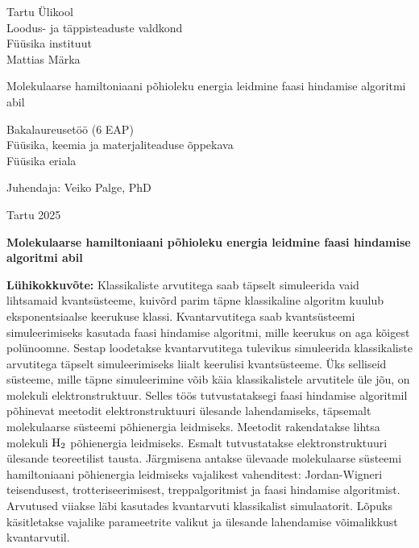 \documentclass[12pt]{report}
\begin{document}
\begin{titlepage}
    \begin{center}
        \large
        {\sc Tartu Ülikool} \\
        Loodus- ja täppisteaduste valdkond \\
        Füüsika instituut \\


        \vspace{25mm}
        \Large Mattias Märka

        \vspace{4mm}
        \Huge Molekulaarse hamiltoniaani põhioleku energia leidmine faasi hindamise algoritmi abil

        \vspace{20mm}
        \Large Bakalaureusetöö (6 EAP) \\
        Füüsika, keemia ja materjaliteaduse õppekava \\
	Füüsika eriala \\

        \vspace{20mm}
        \begin{flushright}
            \Large Juhendaja: Veiko Palge, PhD
        \end{flushright}

        \vfill
        \large Tartu 2025
    \end{center}
\end{titlepage}

\newpage

\noindent\textbf{\large Molekulaarse hamiltoniaani põhioleku energia leidmine faasi hindamise algoritmi abil}

\vspace*{1ex}

\noindent\textbf{Lühikokkuvõte:}
Klassikaliste arvutitega saab täpselt simuleerida vaid lihtsamaid kvantsüsteeme, kuivõrd parim täpne klassikaline algoritm kuulub eksponentsiaalse keerukuse klassi.
Kvantarvutitega saab kvantsüsteemi simuleerimiseks kasutada faasi hindamise algoritmi, mille keerukus on aga kõigest polünoomne.
Sestap loodetakse kvantarvutitega tulevikus simuleerida klassikaliste arvutitega täpselt simuleerimiseks liialt keerulisi kvantsüsteeme.
Üks selliseid süsteeme, mille täpne simuleerimine võib käia klassikalistele arvutitele üle jõu, on molekuli elektronstruktuur.
Selles töös tutvustataksegi faasi hindamise algoritmil põhinevat meetodit elektronstruktuuri ülesande lahendamiseks, täpsemalt molekulaarse süsteemi põhienergia leidmiseks.
Meetodit rakendatakse lihtsa molekuli \(\rm H_2\) põhienergia leidmiseks.
Esmalt tutvustatakse elektronstruktuuri ülesande teoreetilist tausta.
Järgmisena antakse ülevaade molekulaarse süsteemi hamiltoniaani põhienergia leidmiseks vajalikest vahenditest: Jordan-Wigneri teisendusest, trotteriseerimisest, treppalgoritmist ja faasi hindamise algoritmist.
Arvutused viiakse läbi kasutades kvantarvuti klassikalist simulaatorit.
Lõpuks käsitletakse vajalike parameetrite valikut ja ülesande lahendamise võimalikkust kvantarvutil.
\end{document}
